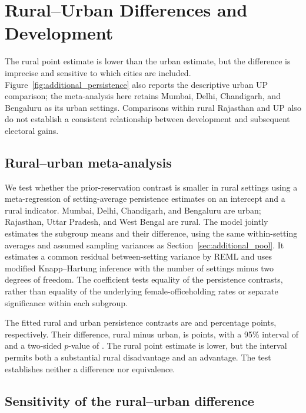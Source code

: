 \clearpage
\section{Rural--Urban Differences and Development}\label{sec:additional_rural_urban}
\suppressfloats[t]

The rural point estimate is lower than the urban estimate, but the difference is imprecise and sensitive to which cities are included. Figure~\ref{fig:additional_persistence} also reports the descriptive urban UP comparison; the meta-analysis here retains Mumbai, Delhi, Chandigarh, and Bengaluru as its urban settings. Comparisons within rural Rajasthan and UP also do not establish a consistent relationship between development and subsequent electoral gains.

\subsection{Rural--urban meta-analysis}

We test whether the prior-reservation contrast is smaller in rural settings using a meta-regression of setting-average persistence estimates on an intercept and a rural indicator. Mumbai, Delhi, Chandigarh, and Bengaluru are urban; Rajasthan, Uttar Pradesh, and West Bengal are rural. The model jointly estimates the subgroup means and their difference, using the same within-setting averages and assumed sampling variances as Section~\ref{sec:additional_pool}. It estimates a common residual between-setting variance by REML and uses modified Knapp--Hartung inference with the number of settings minus two degrees of freedom. The coefficient tests equality of the persistence contrasts, rather than equality of the underlying female-officeholding rates or separate significance within each subgroup.

The fitted rural and urban persistence contrasts are \appRuralMean{} and \appUrbanMean{} percentage points, respectively. Their difference, rural minus urban, is \appRuralGap{} points, with a 95\% interval of \appRuralGapInterval{} and a two-sided $p$-value of \appRuralGapP{}. The rural point estimate is lower, but the interval permits both a substantial rural disadvantage and an advantage. The test establishes neither a difference nor equivalence.

\subsection{Sensitivity of the rural--urban difference}\label{sec:rural_urban_pooling_sensitivity}

